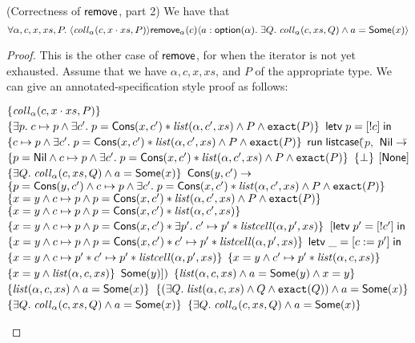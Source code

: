 \begin{lemma}{(Correctness of $\mathsf{remove}$, part 2)}
We have that 
\begin{displaymath}
  \forall \alpha, c, x, xs, P.\; \langle{\mathit{coll}_\alpha(c, x\cdot xs, P)}\rangle{\mathsf{remove}_\alpha(c)}\langle{a:\mathsf{option }{(\alpha)}}.\;{\exists Q.\; \mathit{coll}_\alpha(c, xs, Q) 
                                       \land a = \mathsf{Some}(x)}\rangle
\end{displaymath}
\end{lemma}

\begin{proof}
This is the other case of $\mathsf{remove}$, for when the iterator is not
yet exhausted. Assume that we have $\alpha, c, x, xs$, and $P$ of the
appropriate type. We can give an annotated-specification style proof
as follows:

\begin{specification}
\nextline $\{{\mathit{coll}_\alpha(c, x\cdot xs, P)}\}$ 
\nextline $\{{\exists p.\; c \mapsto p \land \exists c'.\; p = \mathsf{Cons}(x, c') * \mathit{list}(\alpha, c', xs) \land P \land \mathtt{exact}({P})}\}$ 
\nextline $\mathsf{letv}\;p = [!c]\;\mathsf{in}\;$ 
\nextline $\{{c \mapsto p \land \exists c'.\; p = \mathsf{Cons}(x, c') * \mathit{list}(\alpha, c', xs) \land P \land \mathtt{exact}({P})}\}$ 
\nextline $\mathsf{run}\;\mathsf{listcase}($\=$p,$ 
\nextline \> $\mathsf{Nil} \to $\= $\{{p = \mathsf{Nil} \land c \mapsto p \land \exists c'.\; p = \mathsf{Cons}(x, c') * \mathit{list}(\alpha, c', xs) \land P \land \mathtt{exact}({P})}\}$ 
\nextline \> \> $\{{\bot}\}$
\nextline \> \> $[\mathsf{None}]$ 
\nextline \> \> $\{{\exists Q.\; \mathit{coll}_\alpha(c, xs, Q) \land a = \mathsf{Some}(x)}\}$
\nextline \> $\mathsf{Cons}(y, c') \to $ 
\nextline \> \> $\{{p = \mathsf{Cons}(y, c') \land c \mapsto p \land \exists c'.\; p = \mathsf{Cons}(x, c') * \mathit{list}(\alpha, c', xs) \land P \land \mathtt{exact}({P})}\}$ 
\nextline \> \> $\{{x = y \land c \mapsto p \land p = \mathsf{Cons}(x, c') * \mathit{list}(\alpha, c', xs) \land P \land \mathtt{exact}({P})}\}$ 
\nextline \> \> $\{{x = y \land c \mapsto p \land p = \mathsf{Cons}(x, c') * \mathit{list}(\alpha, c', xs)}\}$
\nextline \> \> $\{{x = y \land c \mapsto p \land p = \mathsf{Cons}(x, c') * \exists p'.\; c' \mapsto p' * \mathit{listcell}(\alpha, p', xs)}\}$
\nextline \> \> $[\mathsf{letv}\;p' = [!c']\;\mathsf{in}\;$ 
\nextline \> \> $\{{x = y \land c \mapsto p \land p = \mathsf{Cons}(x, c') * c' \mapsto p' * \mathit{listcell}(\alpha, p', xs)}\}$
\nextline \> \> $\mathsf{letv}\;\_ = [c := p']\;\mathsf{in}\;$ 
\nextline \> \> $\{{x = y \land c \mapsto p' * c' \mapsto p' * \mathit{listcell}(\alpha, p', xs)}\}$
\nextline \> \> $\{{x = y \land c' \mapsto p' * \mathit{list}(\alpha, c, xs)}\}$
\nextline \> \> $\{{x = y \land \mathit{list}(\alpha, c, xs)}\}$
\nextline \> \> $\mathsf{Some}(y)])$
\nextline \> \> $\{{\mathit{list}(\alpha, c, xs) \land a = \mathsf{Some}(y) \land x = y}\}$ 
\nextline \> \> $\{{\mathit{list}(\alpha,c, xs) \land a = \mathsf{Some}(x)}\}$
\nextline \> \> $\{{(\exists Q.\; \mathit{list}(\alpha,c, xs) \land Q \land \mathtt{exact}({Q})) \land a = \mathsf{Some}(x)}\}$
\nextline \> \> $\{{\exists Q.\; \mathit{coll}_\alpha(c, xs, Q) \land a = \mathsf{Some}(x)}\}$
\nextline $\{{\exists Q.\; \mathit{coll}_\alpha(c, xs, Q) \land a = \mathsf{Some}(x)}\}$
\end{specification}
\end{proof}

